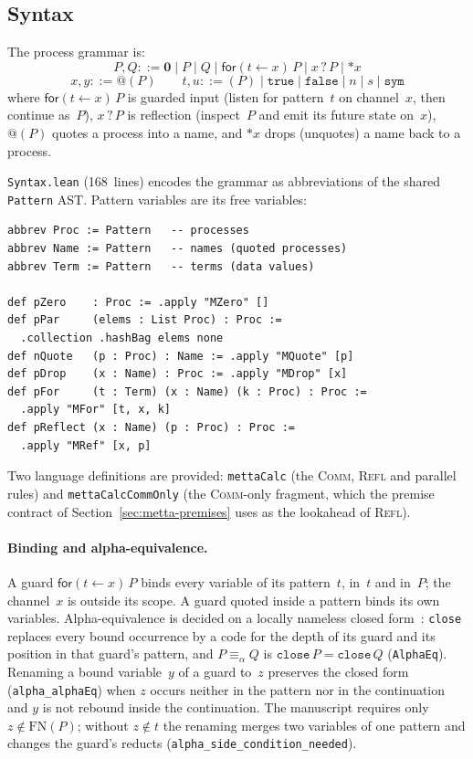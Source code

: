 \documentclass[11pt]{article}
\theoremstyle{definition}
\theoremstyle{remark}
\begin{document}
\subsection{Syntax}

The process grammar is:
\[
  P,Q ::= \mathbf{0} \mid P \mathbin{|} Q \mid
           \mathsf{for}(t \leftarrow x)\, P \mid x\mathbin{?}P
           \mid {*}x
\]
\[
  x,y ::= @(P) \qquad
  t,u ::= (P) \mid \mathtt{true} \mid \mathtt{false} \mid n \mid s \mid \mathtt{sym}
\]
where $\mathsf{for}(t \leftarrow x)\, P$ is guarded input (listen for
pattern~$t$ on channel~$x$, then continue as~$P$), $x\mathbin{?}P$ is
reflection (inspect~$P$ and emit its future state on~$x$), $@(P)$
quotes a process into a name, and ${*}x$ drops (unquotes) a name back
to a process.

\texttt{Syntax.lean} (168~lines) encodes the grammar as abbreviations of
the shared \texttt{Pattern} AST.  Pattern variables are its free
variables:

\begin{lstlisting}[caption={MeTTa-calculus syntax (from \texttt{Syntax.lean})}]
abbrev Proc := Pattern   -- processes
abbrev Name := Pattern   -- names (quoted processes)
abbrev Term := Pattern   -- terms (data values)

def pZero    : Proc := .apply "MZero" []
def pPar     (elems : List Proc) : Proc :=
  .collection .hashBag elems none
def nQuote   (p : Proc) : Name := .apply "MQuote" [p]
def pDrop    (x : Name) : Proc := .apply "MDrop" [x]
def pFor     (t : Term) (x : Name) (k : Proc) : Proc :=
  .apply "MFor" [t, x, k]
def pReflect (x : Name) (p : Proc) : Proc :=
  .apply "MRef" [x, p]
\end{lstlisting}

\noindent
Two language definitions are provided: \texttt{mettaCalc} (the
\textsc{Comm}, \textsc{Refl} and parallel rules) and
\texttt{mettaCalcCommOnly} (the \textsc{Comm}-only fragment, which the
premise contract of Section~\ref{sec:metta-premises} uses as the lookahead
of \textsc{Refl}).

\paragraph{Binding and alpha-equivalence.}
A guard $\mathsf{for}(t \leftarrow x)\,P$ binds every variable of its
pattern~$t$, in~$t$ and in~$P$; the channel~$x$ is outside its scope.
A guard quoted inside a pattern binds its own variables.
Alpha-equivalence is decided on a locally nameless closed
form~\cite{deBruijn1972,Chargueraud2012}: \texttt{close} replaces every
bound occurrence by a code for the depth of its guard and its position in
that guard's pattern, and $P \equiv_\alpha Q$ is
$\mathtt{close}\,P = \mathtt{close}\,Q$ (\texttt{AlphaEq}).
Renaming a bound variable~$y$ of a guard to~$z$ preserves the closed form
(\texttt{alpha\_alphaEq}) when $z$ occurs neither in the pattern nor in the
continuation and $y$ is not rebound inside the continuation.  The
manuscript requires only $z \notin \mathrm{FN}(P)$; without $z \notin t$
the renaming merges two variables of one pattern and changes the guard's
reducts (\texttt{alpha\_side\_condition\_needed}).
\end{document}
